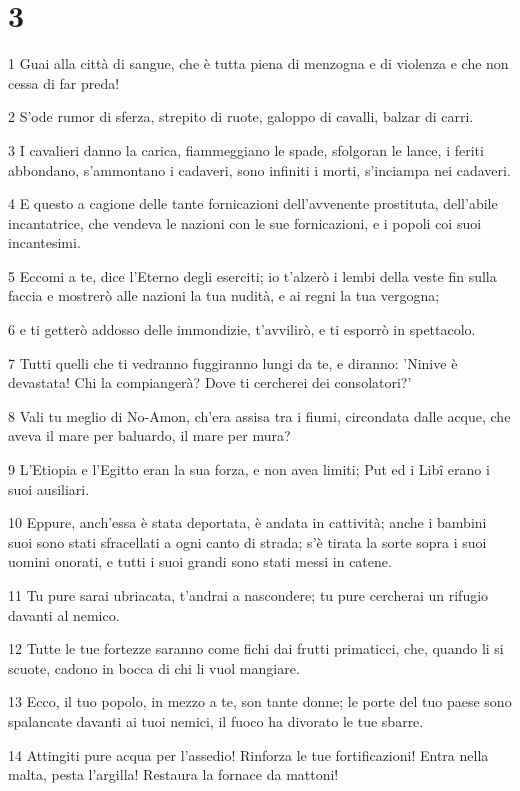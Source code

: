 \chapter{3}

\par 1 Guai alla città di sangue, che è tutta piena di menzogna e di violenza e che non cessa di far preda!
\par 2 S'ode rumor di sferza, strepito di ruote, galoppo di cavalli, balzar di carri.
\par 3 I cavalieri danno la carica, fiammeggiano le spade, sfolgoran le lance, i feriti abbondano, s'ammontano i cadaveri, sono infiniti i morti, s'inciampa nei cadaveri.
\par 4 E questo a cagione delle tante fornicazioni dell'avvenente prostituta, dell'abile incantatrice, che vendeva le nazioni con le sue fornicazioni, e i popoli coi suoi incantesimi.
\par 5 Eccomi a te, dice l'Eterno degli eserciti; io t'alzerò i lembi della veste fin sulla faccia e mostrerò alle nazioni la tua nudità, e ai regni la tua vergogna;
\par 6 e ti getterò addosso delle immondizie, t'avvilirò, e ti esporrò in spettacolo.
\par 7 Tutti quelli che ti vedranno fuggiranno lungi da te, e diranno: 'Ninive è devastata! Chi la compiangerà? Dove ti cercherei dei consolatori?'
\par 8 Vali tu meglio di No-Amon, ch'era assisa tra i fiumi, circondata dalle acque, che aveva il mare per baluardo, il mare per mura?
\par 9 L'Etiopia e l'Egitto eran la sua forza, e non avea limiti; Put ed i Libî erano i suoi ausiliari.
\par 10 Eppure, anch'essa è stata deportata, è andata in cattività; anche i bambini suoi sono stati sfracellati a ogni canto di strada; s'è tirata la sorte sopra i suoi uomini onorati, e tutti i suoi grandi sono stati messi in catene.
\par 11 Tu pure sarai ubriacata, t'andrai a nascondere; tu pure cercherai un rifugio davanti al nemico.
\par 12 Tutte le tue fortezze saranno come fichi dai frutti primaticci, che, quando li si scuote, cadono in bocca di chi li vuol mangiare.
\par 13 Ecco, il tuo popolo, in mezzo a te, son tante donne; le porte del tuo paese sono spalancate davanti ai tuoi nemici, il fuoco ha divorato le tue sbarre.
\par 14 Attingiti pure acqua per l'assedio! Rinforza le tue fortificazioni! Entra nella malta, pesta l'argilla! Restaura la fornace da mattoni!
